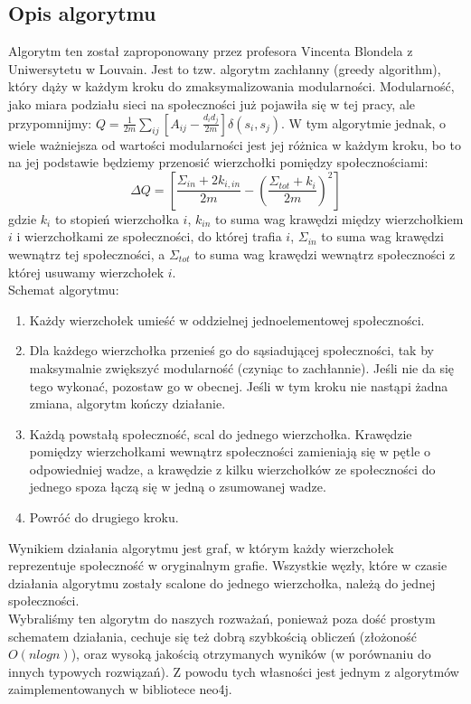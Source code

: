 \documentclass{article}
\begin{document}
\subsection{Opis algorytmu}
Algorytm ten został zaproponowany przez profesora Vincenta Blondela z Uniwersytetu w Louvain. Jest to tzw. algorytm zachłanny (greedy algorithm), który dąży w każdym kroku do zmaksymalizowania modularności. Modularność, jako miara podziału sieci na społeczności już pojawiła się w tej pracy, ale przypomnijmy: $Q= \frac{1}{2m} \sum\limits_{ij} [A_{ij} - \frac{d_i d_j}{2m}]\delta(s_i,s_j)$. W tym algorytmie jednak, o wiele ważniejsza od wartości modularności jest jej różnica w każdym kroku, bo to na jej podstawie będziemy przenosić wierzchołki pomiędzy społecznościami:  $$\Delta Q = [\frac{\Sigma_{in} +2k_{i,in}}{2m} - (\frac{\Sigma_{tot} + k_i}{2m})^2]$$ gdzie $k_i$ to stopień wierzchołka $i$, $k_{in}$ to suma wag krawędzi między wierzchołkiem $i$ i wierzchołkami ze społeczności, do której trafia $i$, $\Sigma_{in}$ to suma wag krawędzi wewnątrz tej społeczności, a $\Sigma_{tot}$ to suma wag krawędzi wewnątrz społeczności z której usuwamy wierzchołek $i$. \\
Schemat algorytmu:
\begin{enumerate}
\item Każdy wierzchołek umieść w oddzielnej jednoelementowej społeczności.
\item Dla każdego wierzchołka przenieś go do sąsiadującej społeczności, tak by maksymalnie zwiększyć modularność (czyniąc to zachłannie). Jeśli nie da się tego wykonać, pozostaw go w obecnej. Jeśli w tym kroku nie nastąpi żadna zmiana, algorytm kończy działanie.
\item Każdą powstałą społeczność, scal do jednego wierzchołka. Krawędzie pomiędzy wierzchołkami wewnątrz społeczności zamieniają się w pętle o odpowiedniej wadze, a krawędzie z kilku wierzchołków ze społeczności do jednego spoza łączą się w jedną o zsumowanej wadze.
\item Powróć do drugiego kroku.
\end{enumerate}
Wynikiem działania algorytmu jest  graf, w którym każdy wierzchołek reprezentuje społeczność w oryginalnym grafie. Wszystkie węzły, które w czasie działania algorytmu zostały scalone do jednego wierzchołka, należą do jednej społeczności. \\ 
Wybraliśmy ten algorytm do naszych rozważań, ponieważ poza dość prostym schematem działania, cechuje się też dobrą szybkością obliczeń (złożoność $O(nlogn)$), oraz wysoką jakością otrzymanych wyników (w porównaniu do innych typowych rozwiązań). Z powodu tych własności jest jednym z algorytmów zaimplementowanych w bibliotece neo4j.
\end{document}
